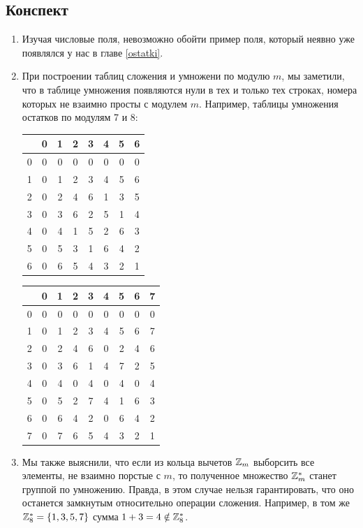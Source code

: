 \subsection*{Конспект}
\begin{enumerate}
\item Изучая числовые поля, невозможно обойти пример поля, который неявно уже появлялся у нас в главе \ref{ostatki}.
\item При построении таблиц сложения и умножени по модулю $m$, мы заметили, что в таблице умножения появляются нули в тех и только тех строках, номера которых не взаимно просты с модулем $m$. Например,
 таблицы умножения остатков по модулям 7 и 8:
\begin{center}
\begin{tabular}{c||c||c|c|c|c|c|c|}
  & 0 & 1 & 2 & 3 & 4 & 5 & 6 \\ \hline\hline
0 & 0 & 0 & 0 & 0 & 0 & 0 & 0 \\ \hline\hline
1 & 0 & 1 & 2 & 3 & 4 & 5 & 6 \\ \hline
2 & 0 & 2 & 4 & 6 & 1 & 3 & 5 \\ \hline
3 & 0 & 3 & 6 & 2 & 5 & 1 & 4 \\ \hline
4 & 0 & 4 & 1 & 5 & 2 & 6 & 3 \\ \hline
5 & 0 & 5 & 3 & 1 & 6 & 4 & 2 \\ \hline
6 & 0 & 6 & 5 & 4 & 3 & 2 & 1 \\ \hline
\end{tabular}
\quad
\begin{tabular}{c||c||c|c|c|c|c|c|c|}
  & 0 & 1 & 2 & 3 & 4 & 5 & 6 & 7 \\ \hline\hline
0 & 0 & 0 & 0 & 0 & 0 & 0 & 0 & 0 \\ \hline\hline
1 & 0 & 1 & 2 & 3 & 4 & 5 & 6 & 7 \\ \hline
2 & 0 & 2 & 4 & 6 & 0 & 2 & 4 & 6 \\ \hline
3 & 0 & 3 & 6 & 1 & 4 & 7 & 2 & 5 \\ \hline
4 & 0 & 4 & 0 & 4 & 0 & 4 & 0 & 4 \\ \hline
5 & 0 & 5 & 2 & 7 & 4 & 1 & 6 & 3 \\ \hline
6 & 0 & 6 & 4 & 2 & 0 & 6 & 4 & 2 \\ \hline
7 & 0 & 7 & 6 & 5 & 4 & 3 & 2 & 1 \\ \hline
\end{tabular}
\end{center}
\item Мы также выяснили, что если из кольца вычетов $\mathbb Z_m$ выборсить все элементы, не взаимно порстые с $m$, то полученное множество $\mathbb Z_m^*$ станет группой по умножению. Правда, в этом случае нельзя гарантировать, что оно останется замкнутым относительно операции сложения. Например, в том же $\mathbb Z_8^*=\{1,3,5,7\}$ сумма $1+3=4\notin\mathbb Z_8^*$.

\end{enumerate}
